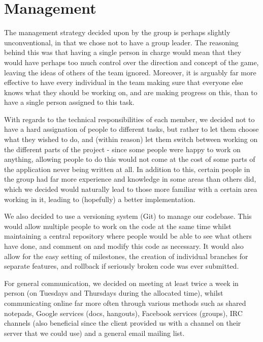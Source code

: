 \documentclass[a4paper,10pt,twoside]{article}
\begin{document}
\section{Management}

The management strategy decided upon by the group is perhaps slightly unconventional, in that we chose not to have a group leader. The reasoning behind this was that having a single person in charge would mean that they would have perhaps too much control over the direction and concept of the game, leaving the ideas of others of the team ignored. Moreover, it is arguably far more effective to have every individual in the team making sure that everyone else knows what they should be working on, and are making progress on this, than to have a single person assigned to this task.

With regards to the technical responsibilities of each member, we decided not to have a hard assignation of people to different tasks, but rather to let them choose what they wished to do, and (within reason) let them switch between working on the different parts of the project - since some people were happy to work on anything, allowing people to do this would not come at the cost of some parts of the application never being written at all. In addition to this, certain people in the group had far more experience and knowledge in some areas than others did, which we decided would naturally lead to those more familiar with a certain area working in it, leading to (hopefully) a better implementation.

We also decided to use a versioning system (Git) to manage our codebase. This would allow multiple people to work on the code at the same time whilst maintaining a central repository where people would be able to see what others have done, and comment on and modify this code as necessary. It would also allow for the easy setting of milestones, the creation of individual branches for separate features, and rollback if seriously broken code was ever submitted.

For general communication, we decided on meeting at least twice a week in person (on Tuesdays and Thursdays during the allocated time), whilst communicating online far more often through various methods such as shared notepads, Google services (docs, hangouts), Facebook services (groups), IRC channels (also beneficial since the client provided us with a channel on their server that we could use) and a general email mailing list. 
\end{document}
